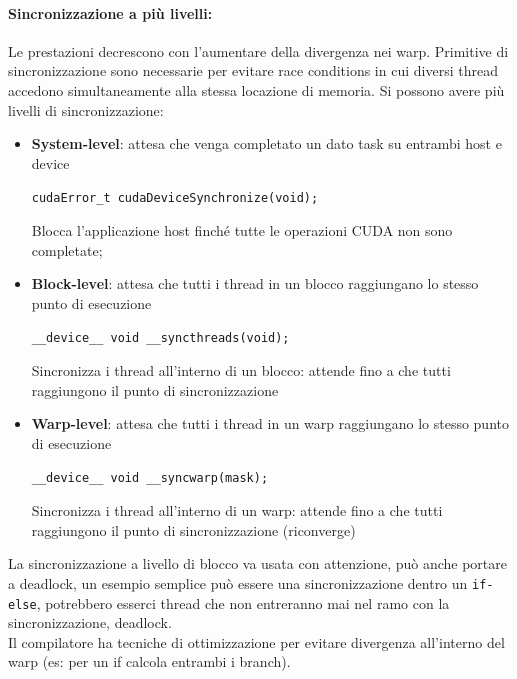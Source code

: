 
\newpage

\paragraph{Sincronizzazione a più livelli: } Le prestazioni decrescono con l'aumentare della divergenza nei warp. Primitive di sincronizzazione sono necessarie per evitare race conditions in cui diversi thread accedono simultaneamente alla stessa locazione di memoria. Si possono avere più livelli di sincronizzazione:
\begin{itemize}
	\item \textbf{System-level}: attesa che venga completato un dato task su entrambi host e device
	\begin{center}
		\texttt{cudaError\_t cudaDeviceSynchronize(void);}
	\end{center}
	Blocca l'applicazione host finché tutte le operazioni CUDA non sono completate;
	
	 \item \textbf{Block-level}: attesa che tutti i thread in un blocco raggiungano lo stesso punto di esecuzione
	 \begin{center}
	 	\texttt{\_\_device\_\_ void \_\_syncthreads(void);}
	 \end{center}
	 Sincronizza i thread all'interno di un blocco: attende fino a che tutti raggiungono il punto di sincronizzazione
	 
	 \item \textbf{Warp-level}: attesa che tutti i thread in un warp raggiungano lo stesso punto di esecuzione
	 \begin{center}
	 	\texttt{\_\_device\_\_ void \_\_syncwarp(mask);}
	 \end{center}
	 Sincronizza i thread all'interno di un warp: attende fino a che tutti raggiungono il punto di sincronizzazione (riconverge)
\end{itemize}
La sincronizzazione a livello di blocco va usata con attenzione, può anche portare a deadlock, un esempio semplice può essere una sincronizzazione dentro un \texttt{if-else}, potrebbero esserci thread che non entreranno mai nel ramo con la sincronizzazione, deadlock.\\

Il compilatore ha tecniche di ottimizzazione per evitare divergenza all'interno del warp (es: per un if calcola entrambi i branch).\\

